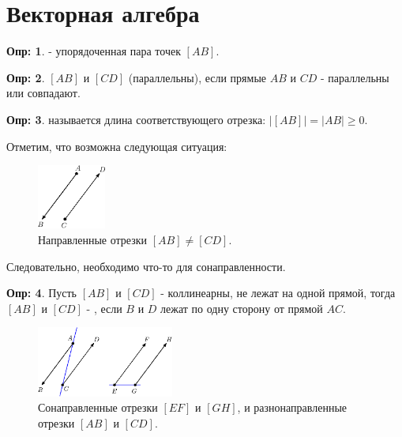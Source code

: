 \documentclass[12pt]{article}
\theoremstyle{definition}
\newtheorem{defn}{Опр:}
\begin{document}
\section*{Векторная алгебра}

\begin{defn}
	 - упорядоченная пара точек $[AB]$.
\end{defn}
\begin{defn}
	$[AB]$ и $[CD]$  (параллельны), если прямые $AB$ и $CD$ - параллельны или совпадают.
\end{defn}
\begin{defn}
	 называется длина соответствующего отрезка: $|[AB]| = |AB| \geq 0$.
\end{defn}

Отметим, что возможна следующая ситуация:
\begin{figure}[H]
	\centering
	\includegraphics[width=0.2\textwidth]{ANGL4_1.eps}
	\caption{Направленные отрезки $[AB] \neq [CD]$.}
	\label{4_1}
\end{figure}
Следовательно, необходимо что-то для сонаправленности.

\begin{defn}
	Пусть $[AB]$ и $[CD]$ - коллинеарны, не лежат на одной прямой, тогда $[AB]$ и $[CD]$ - , если $B$ и $D$ лежат по одну сторону от прямой $AC$.
\end{defn}
\begin{figure}[H]
	\centering
	\includegraphics[width=0.4\textwidth]{ANGL4_2.eps}
	\caption{Сонаправленные отрезки $[EF]$ и $[GH]$, и разнонаправленные отрезки $[AB]$ и $[CD]$.}
	\label{4_2}
\end{figure}
\end{document}
